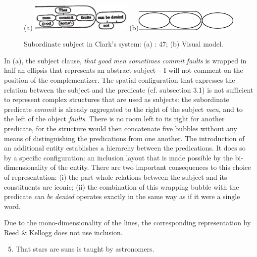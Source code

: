 \documentclass[output=paper]{langsci/langscibook}
\begin{document}
\begin{figure}
    
    \centering
    (a)\includegraphics[width=0.45\textwidth]{figures/04/Kap.4.img.0009a.jpg}
    (b)\includegraphics[width=0.45\textwidth]{figures/04/Kap.4.img.0009b.png}
    \caption{Subordinate subject in Clark’s system: (a) \citeyear{clark_normal_1870}: 47; (b) Visual model.}
    \label{fig: 9}
\end{figure}
 

In (a), the subject clause, \textit{that} \textit{good} \textit{men} \textit{sometimes} \textit{commit} \textit{faults} is wrapped in half an ellipsis that represents an abstract subject – I will not comment on the position of the complementizer. The spatial configuration that expresses the relation between the subject and the predicate (cf. subsection 3.1) is not sufficient to represent complex structures that are used as subjects: the subordinate predicate \textit{commit} is already aggregated to the right of the subject \textit{men}, and to the left of the object \textit{faults}. There is no room left to its right for another predicate, for the structure would then concatenate five bubbles without any means of distinguishing the predications from one another. The introduction of an additional entity establishes a hierarchy between the predications. It does so by a specific configuration: an inclusion layout that is made possible by the bi-dimensionality of the entity. There are two important consequences to this choice of representation: (i) the part-whole relations between the subject and its constituents are iconic; (ii) the combination of this wrapping bubble with the predicate \textit{can} \textit{be} \textit{denied} operates exactly in the same way as if it were a single word.

Due to the mono-dimensionality of the lines, the corresponding representation by Reed \& Kellogg does not use inclusion.

\ea%

    \begin{enumerate}\setcounter{enumi}{4}
    \label{ex:key:5}
    \centering
     \item That stars are suns is taught by astronomers.
    \end{enumerate}
\end{document}
